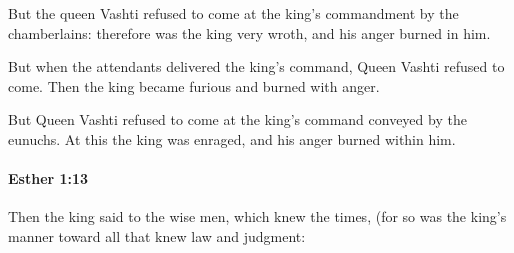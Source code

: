 			\begin{versebox}
					\item[BHS] 
					\item[LXX] 
					\item[ASV] But the queen Vashti refused to come at the king's commandment by the chamberlains: therefore was the king very wroth, and his anger burned in him.
					\item[NIV] But when the attendants delivered the king’s command, Queen Vashti refused to come. Then the king became furious and burned with anger.
					\item[NRSV] But Queen Vashti refused to come at the king’s command conveyed by the eunuchs. At this the king was enraged, and his anger burned within him.
			\end{versebox}

		\paragraph{Esther 1:13} %
			\label{ESTHER-1-13}

			Then the king said to the wise men, which knew the times, (for so was the king’s manner toward all that knew law and judgment:

